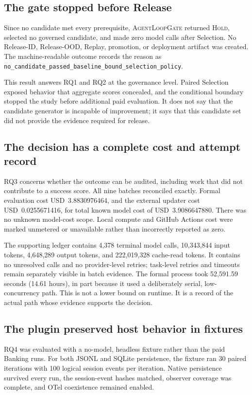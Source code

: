\documentclass[10pt,twocolumn]{article}
\newcommand{\system}{\textsc{AgentLoopGate}\xspace}
\newcommand{\hold}{\textsc{Hold}\xspace}
\begin{document}
\subsection{The gate stopped before Release}

Since no candidate met every prerequisite, \system returned \hold, selected
no governed candidate, and made zero model calls after Selection. No
Release-ID, Release-OOD, Replay, promotion, or deployment artifact was created.
The machine-readable outcome records the reason as
\nolinkurl{no_candidate_passed_baseline_bound_selection_policy}.

This result answers RQ1 and RQ2 at the governance level. Paired Selection
exposed behavior that aggregate scores concealed, and the conditional boundary
stopped the study before additional paid evaluation. It does not say that the
candidate generator is incapable of improvement; it says that this candidate
set did not provide the evidence required for release.

\subsection{The decision has a complete cost and attempt record}

RQ3 concerns whether the outcome can be audited, including work that did not
contribute to a success score. All nine batches reconciled exactly. Formal
evaluation cost USD~3.8830976464, and the external updater cost
USD~0.0255671416, for total known model cost of USD~3.9086647880. There was no
unknown model-cost scope. Local compute and GitHub Actions cost were marked
unmetered or unavailable rather than incorrectly reported as zero.

The supporting ledger contains 4,378 terminal model calls, 10,343,844 input
tokens, 4,648,289 output tokens, and 222,019,328 cache-read tokens. It contains
no unresolved calls and no provider-level retries; task-level retries and
timeouts remain separately visible in batch evidence. The formal process took
52,591.59 seconds (14.61 hours), in part because it used a deliberately serial,
low-concurrency path. This is not a lower bound on runtime. It is a record of
the actual path whose evidence supports the decision.

\subsection{The plugin preserved host behavior in fixtures}

RQ4 was evaluated with a no-model, headless fixture rather than the paid
Banking runs. For both JSONL and SQLite persistence, the fixture ran 30 paired
iterations with 100 logical session events per iteration. Native persistence
survived every run, the session-event hashes matched, observer coverage was
complete, and OTel coexistence remained enabled.
\end{document}
